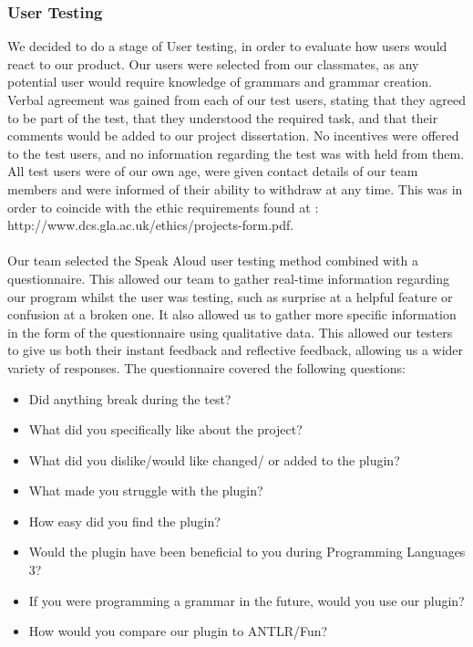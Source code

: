 \subsubsection{User Testing}
We decided to do a stage of User testing, in order to evaluate how users would react to our product. Our users were selected from our classmates, as any potential user would require knowledge of grammars and grammar creation. Verbal agreement was gained from each of our test users, stating that they agreed to be part of the test, that they understood the required task, and that their comments would be added to our project dissertation. No incentives were offered to the test users, and no information regarding the test was with held from them.  All test users were of our own age, were given contact details of our team members and were informed of their ability to withdraw at any time. This was in order to coincide with the ethic requirements found at : http://www.dcs.gla.ac.uk/ethics/projects-form.pdf.\\
\\
Our team selected the Speak Aloud user testing method combined with a questionnaire. This allowed our team to gather real-time information regarding our program whilst the user was testing, such as surprise at a helpful feature or confusion at a broken one. It also allowed us to gather more specific information in the form of the questionnaire using qualitative data. This allowed our testers to give us both their instant feedback and reflective feedback, allowing us a wider variety of responses. The questionnaire covered the following questions:
\begin {itemize}
    \item Did anything break during the test?
    \item What did you specifically like about the project?
    \item What did you dislike/would like changed/ or added to the plugin?
    \item What made you struggle with the plugin?
    \item How easy did you find the plugin?
    \item Would the plugin have been beneficial to you during Programming Languages 3?
    \item If you were programming a grammar in the future, would you use our plugin?
    \item How would you compare our plugin to ANTLR/Fun?
\end{itemize}

